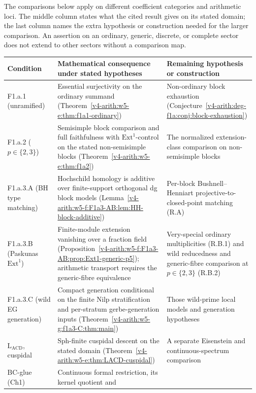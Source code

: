 The comparisons below apply on different coefficient categories and
arithmetic loci. The middle column states what the cited result gives
on its stated domain; the last column names the extra hypothesis or
construction needed for the larger comparison. An assertion on an
ordinary, generic, discrete, or complete sector does not extend to
other sectors without a comparison map.

\begingroup
\small
\begin{longtable}{@{}p{}|p{}|p{}@{}}
Condition & Mathematical consequence under stated hypotheses & Remaining hypothesis or construction \\
\hline
\endhead
F1.a.1 (unramified) & Essential surjectivity on the ordinary summand
(Theorem~\ref{v4-arith:w5-e:thm:f1a1-ordinary}) & Non-ordinary block exhaustion
(Conjecture~\ref{v4-arith:deg-f1a:conj:block-exhaustion}) \\
F1.a.2 (\(p\in\{2,3\}\)) & Semisimple block comparison and full
faithfulness with \(\mathrm{Ext}^{1}\)-control on the stated
non-semisimple blocks (Theorem~\ref{v4-arith:w5-e:thm:f1a2}) & The normalized
extension-class comparison on non-semisimple blocks \\
F1.a.3.A (BH type matching) & Hochschild homology is additive over
finite-support orthogonal dg block models
(Lemma~\ref{v4-arith:w5-f:F1a3-AB:lem:HH-block-additive}) & Per-block
Bushnell--Henniart projective-to-closed-point matching (R.A) \\
F1.a.3.B (Paskunas \(\mathrm{Ext}^{1}\)) & Finite-module
extension vanishing over a fraction field
(Proposition~\ref{v4-arith:w5-f:F1a3-AB:prop:Ext1-generic-p5});
arithmetic transport requires the generic-fibre equivalence & Very-special
ordinary multiplicities (R.B.1) and wild reducedness and generic-fibre comparison
at \(p\in\{2,3\}\) (R.B.2) \\
F1.a.3.C (wild EG generation) & Compact generation conditional on the
finite Nilp stratification and per-stratum gerbe-generation inputs
(Theorem~\ref{v4-arith:w5-g:f1a3-C:thm:main}) & Those wild-prime local models
and generation hypotheses \\
\(\mathrm{L}_{\mathrm{ACD}}\), cuspidal & Sph-finite cuspidal descent
on the stated domain (Theorem~\ref{v4-arith:w5-e:thm:LACD-cuspidal}) & A
separate Eisenstein and continuous-spectrum comparison \\
BC-glue (Ch1) & Continuous formal restriction, its kernel quotient and

\end{longtable}
